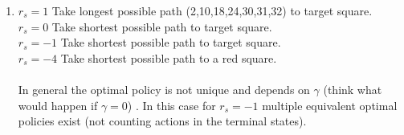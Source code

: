 \documentclass[11pt]{article}
\begin{document}
\begin{tcolorbox}[breakable]

\begin{enumerate}[label=(\alph*)]
    \item $r_s = 1$ Take longest possible path (2,10,18,24,30,31,32) to target square.\\
    $r_s = 0$ Take shortest possible path to target square. \\
    $r_s = -1$ Take shortest possible path to target square. \\
    $r_s = -4$ Take shortest possible path to a red square. \\ \\
    In general the optimal policy is not unique and depends on $\gamma$ (think what would happen if $\gamma = 0$) . In this case for $r_s = -1$ multiple equivalent optimal policies exist (not counting actions in the terminal states).\\
    

\end{enumerate}
\end{tcolorbox}
\end{document}

